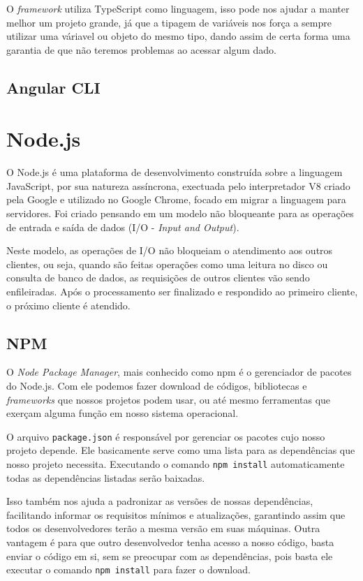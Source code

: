 \documentclass[
	12pt,				%
	openright,			%
	twoside,			%
	a4paper,			%
	english,			%
	brazil				%
	]{abntex2}
\begin{document}
O \textit{framework} utiliza TypeScript como linguagem, isso pode nos ajudar a manter melhor um projeto grande, já que a tipagem de variáveis nos força a sempre utilizar uma váriavel ou objeto do mesmo tipo, dando assim de certa forma uma garantia de que não teremos problemas ao acessar algum dado.

\subsection{Angular CLI} 


\section{Node.js}

O Node.js é uma plataforma de desenvolvimento construída sobre a linguagem JavaScript, por sua natureza assíncrona, exectuada pelo interpretador V8 criado pela Google e utilizado no Google Chrome, focado em migrar a linguagem para servidores. Foi criado pensando em um modelo não bloqueante para as operações de entrada e saída de dados (I/O - \textit{Input and Output}).

Neste modelo, as operações de I/O não bloqueiam o atendimento aos outros clientes, ou seja, quando são feitas operações como uma leitura no disco ou consulta de banco de dados, as requisições de outros clientes vão sendo enfileiradas. Após o processamento ser finalizado e respondido ao primeiro cliente, o próximo cliente é atendido.

\subsection{NPM}

O \textit{Node Package Manager}, mais conhecido como npm é o gerenciador de pacotes do Node.js. Com ele podemos fazer download de códigos, bibliotecas e \textit{frameworks} que nossos projetos podem usar, ou até mesmo ferramentas que exerçam alguma função em nosso sistema operacional.

O arquivo \verb|package.json| é responsável por gerenciar os pacotes cujo nosso projeto depende. Ele basicamente serve como uma lista para as dependências que nosso projeto necessita. Executando o comando \verb|npm install| automaticamente todas as dependências listadas serão baixadas.

Isso também nos ajuda a padronizar as versões de nossas dependências, facilitando informar os requisitos mínimos e atualizações, garantindo assim que todos os desenvolvedores terão a mesma versão em suas máquinas. Outra vantagem é para que outro desenvolvedor tenha acesso a nosso código, basta enviar o código em si, sem se preocupar com as dependências, pois basta ele executar o comando \verb|npm install| para fazer o download. 
\end{document}
